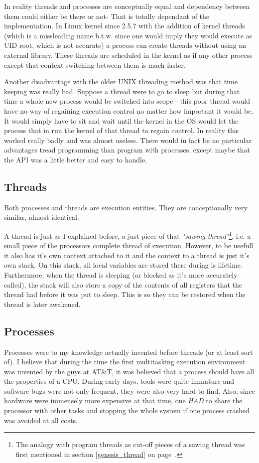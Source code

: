 		In reality threads and processes are conceptually equal and dependency between them could either be there or not- That is totally dependant of the implementation. In Linux kernel since 2.5.7 with the addition of kernel threads (which is a missleading name b.t.w. since one would imply they would execute as UID root, which is not accurate) a process can create threads without using an external library. These threads are scheduled in the kernel as if any other process except that context switching between them is much faster.

		Another disadvantage with the older UNIX threading method was that time keeping was really bad. Suppose a thread were to go to sleep but during that time a whole new process would be switched into scope - this poor thread would have no way of regaining execution control no matter how important it would be. It would simply have to sit and wait until the kernel in the OS would let the process that in run the kernel of that thread to regain control. In reality this worked really badly and was almost useless. There would in fact be no particular advantages tread programming than program with processes, except maybe that the API was a little better and easy to handle.



		\subsection{Threads}
			Both processes and threads are execution entities. They are conceptionally very similar, almost identical.

			A thread is just as I explained before, a just piece of that \textit{"sawing thread"}\footnote{The analogy with program threads as cut-off pieces of a sawing thread was first mentioned in section \ref{genesis_thread} on page~\pageref{genesis_thread}.}, i.e. a small piece of the processors complete thread of execution. However, to be usefull it also has it's own context attached to it and the context to a thread is just it's own stack. On this stack, all local variables are stored there during is lifetime. Furthermore, when the thread is sleeping (or blocked as it's more accurately called), the stack will also store a copy of the contents of all registers that the thread had before it was put to sleep. This is so they can be restored when the thread is later awakened.

		\subsection{Processes}
			Processes were to my knowledge actually invented before threads (or at least sort of).
			I believe that during the time the first multitasking execution environment was invented by the guys at AT\&T, it was believed that a process should have all the properties of a CPU. During early days, tools were quite immature and software bugs were not only frequent, they were also very hard to find. Also, since hardware were immensely more expensive at that time, one \textit{HAD} to share the processor with other tasks and stopping the whole system if one process crashed was avoided at all costs. 

